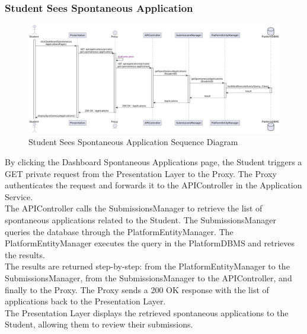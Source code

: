 \subsubsection*{Student Sees Spontaneous Application}
\begin{figure}[H]
    \centering
    \includegraphics[width=\linewidth]{Latex/Images/DD/SequenceDiagrams/13StudentSeeSpontaneousApplications.png}
    \caption{Student Sees Spontaneous Application Sequence Diagram}
    \label{fig:studseespontapp}
\end{figure}
By clicking the Dashboard Spontaneous Applications page, the Student triggers a GET private request from the Presentation Layer to the Proxy. The Proxy authenticates the request and forwards it to the APIController in the Application Service.\\
The APIController calls the SubmissionsManager to retrieve the list of spontaneous applications related to the Student. The SubmissionsManager queries the database through the PlatformEntityManager. The PlatformEntityManager executes the query in the PlatformDBMS and retrieves the results.\\
The results are returned step-by-step: from the PlatformEntityManager to the SubmissionsManager, from the SubmissionsManager to the APIController, and finally to the Proxy. The Proxy sends a 200 OK response with the list of applications back to the Presentation Layer.\\
The Presentation Layer displays the retrieved spontaneous applications to the Student, allowing them to review their submissions.

